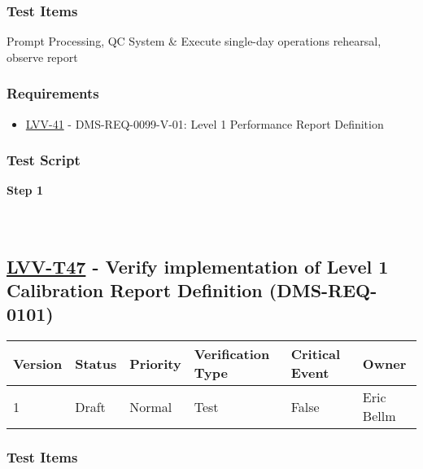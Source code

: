 \hypertarget{test-items-22}{%
\subsubsection{Test Items}\label{test-items-22}}

Prompt Processing, QC System \& Execute single-day operations rehearsal,
observe report

\hypertarget{requirements-23}{%
\subsubsection{Requirements}\label{requirements-23}}

\begin{itemize}
\tightlist
\item
  \href{https://jira.lsstcorp.org/browse/LVV-41}{LVV-41} -
  DMS-REQ-0099-V-01: Level 1 Performance Report Definition
\end{itemize}

\hypertarget{test-script-23}{%
\subsubsection{Test Script}\label{test-script-23}}

\textbf{Step 1}\\
~\\
~\\

\hypertarget{lvv-t47---verify-implementation-of-level-1-calibration-report-definition-dms-req-0101}{%
\subsection{\texorpdfstring{\href{https://jira.lsstcorp.org/secure/Tests.jspa\#/testCase/LVV-T47}{LVV-T47}
- Verify implementation of Level 1 Calibration Report Definition
(DMS-REQ-0101)}{LVV-T47 - Verify implementation of Level 1 Calibration Report Definition (DMS-REQ-0101)}}\label{lvv-t47---verify-implementation-of-level-1-calibration-report-definition-dms-req-0101}}

\begin{longtable}[]{@{}llllll@{}}
\toprule
Version & Status & Priority & Verification Type & Critical Event &
Owner\tabularnewline
\midrule
\endhead
1 & Draft & Normal & Test & False & Eric Bellm\tabularnewline
\bottomrule
\end{longtable}

\hypertarget{test-items-23}{%
\subsubsection{Test Items}\label{test-items-23}}

